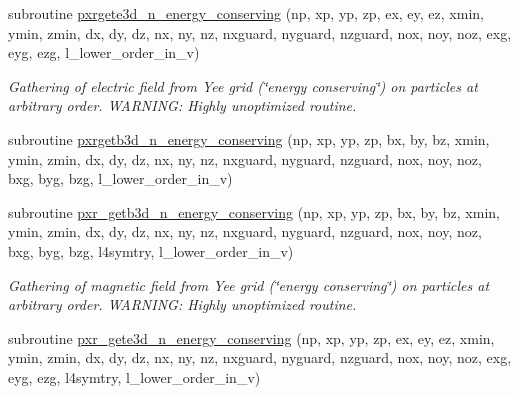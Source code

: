 \begin{DoxyCompactItemize}
subroutine \hyperlink{field__gathering_8_f90_aff764c0eb8ae48e31d7bb6f39467cabf}{pxrgete3d\+\_\+n\+\_\+energy\+\_\+conserving} (np, xp, yp, zp, ex, ey, ez, xmin, ymin, zmin,                                                                                                                                                                           dx, dy, dz, nx, ny, nz, nxguard, nyguard, nzguard,                                                                                                                                                   nox, noy, noz, exg, eyg, ezg, l\+\_\+lower\+\_\+order\+\_\+in\+\_\+v)
\begin{DoxyCompactList}\small\item\em Gathering of electric field from Yee grid (\char`\"{}energy conserving\char`\"{}) on particles at arbitrary order. W\+A\+R\+N\+I\+NG\+: Highly unoptimized routine. \end{DoxyCompactList}\item 
subroutine \hyperlink{field__gathering_8_f90_aa51d5771b10a0ee5f74ceda73388778e}{pxrgetb3d\+\_\+n\+\_\+energy\+\_\+conserving} (np, xp, yp, zp, bx, by, bz, xmin, ymin, zmin,                                                                                                                                                               dx, dy, dz, nx, ny, nz, nxguard, nyguard, nzguard,                                                                                                                                                   nox, noy, noz, bxg, byg, bzg, l\+\_\+lower\+\_\+order\+\_\+in\+\_\+v)
\item 
subroutine \hyperlink{field__gathering_8_f90_a3d18b5a2fca069b67c4e49c7d1559dd8}{pxr\+\_\+getb3d\+\_\+n\+\_\+energy\+\_\+conserving} (np, xp, yp, zp, bx, by, bz, xmin, ymin, zmin, dx, dy, dz, nx, ny, nz, nxguard, nyguard, nzguard,                                                                                                                                                       nox, noy, noz, bxg, byg, bzg, l4symtry, l\+\_\+lower\+\_\+order\+\_\+in\+\_\+v)
\begin{DoxyCompactList}\small\item\em Gathering of magnetic field from Yee grid (\char`\"{}energy conserving\char`\"{}) on particles at arbitrary order. W\+A\+R\+N\+I\+NG\+: Highly unoptimized routine. \end{DoxyCompactList}\item 
subroutine \hyperlink{field__gathering_8_f90_af8a29b924d0086de0d933851a07b5f32}{pxr\+\_\+gete3d\+\_\+n\+\_\+energy\+\_\+conserving} (np, xp, yp, zp, ex, ey, ez, xmin, ymin, zmin, dx, dy, dz, nx, ny, nz, nxguard, nyguard, nzguard,                                                                                                                                                       nox, noy, noz, exg, eyg, ezg, l4symtry, l\+\_\+lower\+\_\+order\+\_\+in\+\_\+v)

\end{DoxyCompactItemize}
